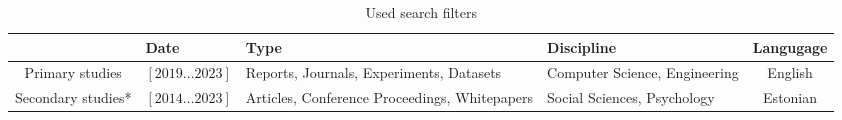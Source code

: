 \begin{table}[h]
\label{tab:filters1}
\centering

\caption{Used search filters}
\begin{tabularx}{\textwidth}{|c|Y|Y|Y|c|}
\hline
\textbf{}          & \textbf{Date}     & \textbf{Type}                                 & \textbf{Discipline}           & \textbf{Langugage} \\\hline
Primary studies    & $[2019\dots2023]$ & Reports, Journals, Experiments, Datasets      & Computer Science, Engineering     & English            \\\hline
Secondary studies* & $[2014\dots2023]$ & Articles, Conference Proceedings, Whitepapers & Social Sciences, Psychology & Estonian \\\hline
\end{tabularx}
\end{table}



